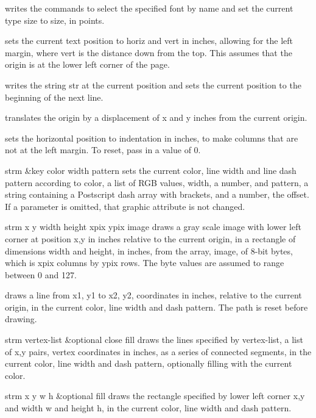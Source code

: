 \documentclass[twoside,openright,11pt]{report}
\begin{document}
{writes the commands to select the specified font by name and set the
current type size to size, in points.}

{sets the current text position to horiz and vert in inches, allowing
for the left margin, where vert is the distance down from the top.
This assumes that the origin is at the lower left corner of the page.}

{writes the string str at the current position and sets the current
position to the beginning of the next line.}

{translates the origin by a displacement of x and y inches from the
current origin.}

{sets the horizontal position to indentation in inches, to make columns
that are not at the left margin.  To reset, pass in a value of 0.}

{strm \&key color width pattern}
{sets the current color, line width and line dash pattern according to
color, a list of RGB values, width, a number, and pattern, a string
containing a Postscript dash array with brackets, and a number, the
offset.  If a parameter is omitted, that graphic attribute is not
changed.}

{strm x y width height xpix ypix image}
{draws a gray scale image with lower left corner at position x,y in
inches relative to the current origin, in a rectangle of dimensions
width and height, in inches, from the array, image, of 8-bit bytes,
which is xpix columns by ypix rows.  The byte values are assumed to
range between 0 and 127.}

{draws a line from x1, y1 to x2, y2, coordinates in inches, relative to
the current origin, in the current color, line width and dash
pattern.  The path is reset before drawing.}

{strm vertex-list \&optional close fill}
{draws the lines specified by vertex-list, a list of x,y pairs, vertex
coordinates in inches, as a series of connected segments, in the
current color, line width and dash pattern, optionally filling with
the current color.}

{strm x y w h \&optional fill}
{draws the rectangle specified by lower left corner x,y and width w and
height h, in the current color, line width and dash pattern.}
\end{document}
